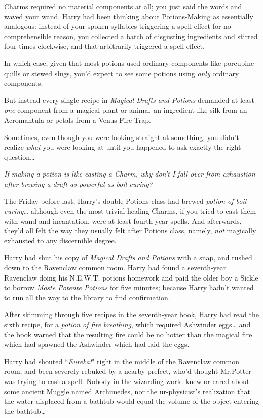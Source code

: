 Charms required no material components at all; you just said the words and waved your wand. Harry had been thinking about Potions-Making as essentially analogous: instead of your spoken syllables triggering a spell effect for no comprehensible reason, you collected a batch of disgusting ingredients and stirred four times clockwise, and that arbitrarily triggered a spell effect.

In which case, given that most potions used ordinary components like porcupine quills or stewed slugs, you'd expect to see some potions using \emph{only} ordinary components.

But instead every single recipe in \emph{Magical Drafts and Potions} demanded at least \emph{one} component from a magical plant or animal\---an ingredient like silk from an Acromantula or petals from a Venus Fire Trap.

Sometimes, even though you were looking straight at something, you didn't realize \emph{what} you were looking at until you happened to ask exactly the right question{\ldots}

\emph{If making a potion is like casting a Charm, why don't I fall over from exhaustion after brewing a draft as powerful as boil-curing?}

The Friday before last, Harry's double Potions class had brewed \emph{potion of boil-curing{\ldots}} although even the most trivial healing Charms, if you tried to cast them with wand and incantation, were at least fourth-year spells. And afterwards, they'd all felt the way they usually felt after Potions class, namely, \emph{not} magically exhausted to any discernible degree.

Harry had shut his copy of \emph{Magical Drafts and Potions} with a snap, and rushed down to the Ravenclaw common room. Harry had found a seventh-year Ravenclaw doing his N.E.W.T. potions homework and paid the older boy a Sickle to borrow \emph{Moste Potente Potions} for five minutes; because Harry hadn't wanted to run all the way to the library to find confirmation.

After skimming through five recipes in the seventh-year book, Harry had read the sixth recipe, for a \emph{potion of fire breathing}, which required Ashwinder eggs{\ldots} and the book warned that the resulting fire could be no hotter than the magical fire which had spawned the Ashwinder which had laid the eggs.

Harry had shouted ``\emph{Eureka!}" right in the middle of the Ravenclaw common room, and been severely rebuked by a nearby prefect, who'd thought Mr.\?Potter was trying to cast a spell. Nobody in the wizarding world knew or cared about some ancient Muggle named Archimedes, nor the ur-physicist's realization that the water displaced from a bathtub would equal the volume of the object entering the bathtub{\ldots}

